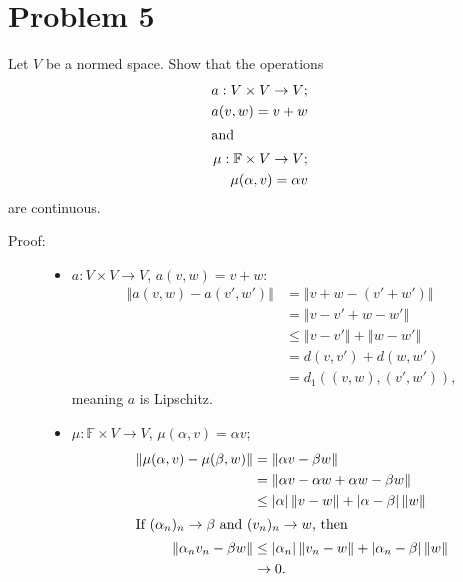 \documentclass[8pt]{extarticle}
\newcommand{\norm}[1]{\left\Vert #1\right\Vert}
\begin{document}
  \section{Problem 5}%
  Let $V$ be a normed space. Show that the operations
  \begin{align*}
    a: V\times V \rightarrow V;\\
    a(v,w) = v+w\\
    \intertext{and}
    \mu: \mathbb{F}\times V\rightarrow V;\\
    \mu(\alpha,v) = \alpha v
  \end{align*}
  are continuous.
  \begin{description}
    \item[Proof:]\hfill
    \begin{itemize}
        \item $a: V\times V\rightarrow V$, $a(v,w) = v+w$:
          \begin{align*}
            \norm{a(v,w) - a(v',w')} &= \norm{v+w-(v'+  w')}\\
                                     &= \norm{v-v' + w-w'}\\
                                     &\leq \norm{v-v'} + \norm{w-w'}\\
                                     &= d(v,v') + d(w,w')\\
                                     &= d_1((v,w),(v',w')),
          \end{align*}
          meaning $a$ is Lipschitz.
        \item $\mu: \mathbb{F}\times V \rightarrow V$, $\mu(\alpha,v) = \alpha v$;
          \begin{align*}
            \norm{\mu(\alpha,v)-\mu(\beta,w)} &= \norm{\alpha v - \beta w}\\
                                          &= \norm{\alpha v - \alpha w + \alpha w - \beta w}\\
                                          &\leq |\alpha|\norm{v-w} + |\alpha - \beta| \norm{w}\\
          \intertext{If $(\alpha_n)_n\rightarrow \beta$ and $(v_n)_n\rightarrow w$, then}
            \norm{\alpha_nv_n - \beta w} &\leq |\alpha_n|\norm{v_n-w} + |\alpha_n - \beta|\norm{w}\\
                                         &\rightarrow 0.
          \end{align*}
    \end{itemize}
  \end{description}
\end{document}
